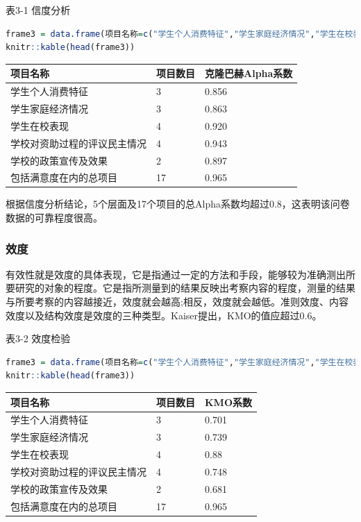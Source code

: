 \documentclass[UTF8,a4paper,12pt]{ctexart}  %
\begin{document}
表3-1 信度分析

\begin{lstlisting}[language=R]
frame3 = data.frame(项目名称=c("学生个人消费特征","学生家庭经济情况","学生在校表现","学校对资助过程的评议民主情况","学校的政策宣传及效果","包括满意度在内的总项目"),项目数目=c("3","3","4","4","2","17"),克隆巴赫Alpha系数=c("0.856","0.863","0.920","0.943","0.897","0.965"))
knitr::kable(head(frame3))
\end{lstlisting}

\begin{tabular}{l|l|l}
\hline
项目名称 & 项目数目 & 克隆巴赫Alpha系数\\
\hline
学生个人消费特征 & 3 & 0.856\\
\hline
学生家庭经济情况 & 3 & 0.863\\
\hline
学生在校表现 & 4 & 0.920\\
\hline
学校对资助过程的评议民主情况 & 4 & 0.943\\
\hline
学校的政策宣传及效果 & 2 & 0.897\\
\hline
包括满意度在内的总项目 & 17 & 0.965\\
\hline
\end{tabular}

根据信度分析结论，5个层面及17个项目的总Alpha系数均超过0.8，这表明该问卷数据的可靠程度很高。

\hypertarget{section-22}{%
\subsubsection{效度}\label{section-22}}

有效性就是效度的具体表现，它是指通过一定的方法和手段，能够较为准确测出所要研究的对象的程度。它是指所测量到的结果反映出考察内容的程度，测量的结果与所要考察的内容越接近，效度就会越高;相反，效度就会越低。准则效度、内容效度以及结构效度是效度的三种类型。Kaiser提出，KMO的值应超过0.6。

表3-2 效度检验

\begin{lstlisting}[language=R]
frame3 = data.frame(项目名称=c("学生个人消费特征","学生家庭经济情况","学生在校表现","学校对资助过程的评议民主情况","学校的政策宣传及效果","包括满意度在内的总项目"),项目数目=c("3","3","4","4","2","17"),KMO系数=c("0.701","0.739","0.88","0.748","0.681","0.965"))
knitr::kable(head(frame3))
\end{lstlisting}

\begin{tabular}{l|l|l}
\hline
项目名称 & 项目数目 & KMO系数\\
\hline
学生个人消费特征 & 3 & 0.701\\
\hline
学生家庭经济情况 & 3 & 0.739\\
\hline
学生在校表现 & 4 & 0.88\\
\hline
学校对资助过程的评议民主情况 & 4 & 0.748\\
\hline
学校的政策宣传及效果 & 2 & 0.681\\
\hline
包括满意度在内的总项目 & 17 & 0.965\\
\hline
\end{tabular}
\end{document}
